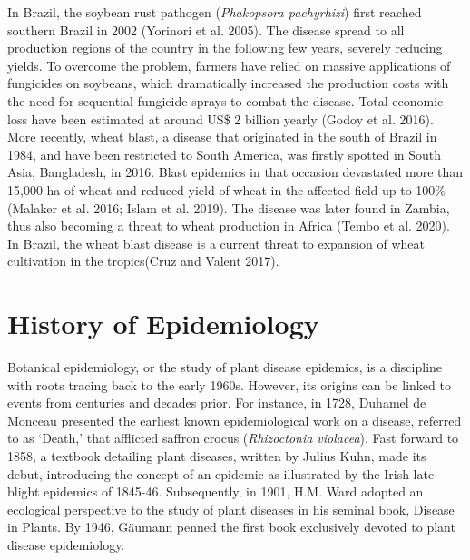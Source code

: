\documentclass[
  letterpaper,
  DIV=11,
  numbers=noendperiod]{scrreprt}
\begin{document}
\begin{tcolorbox}[enhanced jigsaw, bottomtitle=1mm, colbacktitle=quarto-callout-note-color!10!white, breakable, left=2mm, leftrule=.75mm, rightrule=.15mm, toprule=.15mm, colframe=quarto-callout-note-color-frame, arc=.35mm, toptitle=1mm, opacityback=0, coltitle=black, title=\textcolor{quarto-callout-note-color}{\faInfo}\hspace{0.5em}{Box 1: Diseases on the move}, colback=white, titlerule=0mm, bottomrule=.15mm, opacitybacktitle=0.6]

In Brazil, the soybean rust pathogen (\emph{Phakopsora pachyrhizi})
first reached southern Brazil in 2002 (Yorinori et al. 2005). The
disease spread to all production regions of the country in the following
few years, severely reducing yields. To overcome the problem, farmers
have relied on massive applications of fungicides on soybeans, which
dramatically increased the production costs with the need for sequential
fungicide sprays to combat the disease. Total economic loss have been
estimated at around US\$ 2 billion yearly (Godoy et al. 2016). More
recently, wheat blast, a disease that originated in the south of Brazil
in 1984, and have been restricted to South America, was firstly spotted
in South Asia, Bangladesh, in 2016. Blast epidemics in that occasion
devastated more than 15,000 ha of wheat and reduced yield of wheat in
the affected field up to 100\% (Malaker et al. 2016; Islam et al. 2019).
The disease was later found in Zambia, thus also becoming a threat to
wheat production in Africa (Tembo et al. 2020). In Brazil, the wheat
blast disease is a current threat to expansion of wheat cultivation in
the tropics(Cruz and Valent 2017).

\end{tcolorbox}

\hypertarget{history-of-epidemiology}{%
\section{History of Epidemiology}\label{history-of-epidemiology}}

Botanical epidemiology, or the study of plant disease epidemics, is a
discipline with roots tracing back to the early 1960s. However, its
origins can be linked to events from centuries and decades prior. For
instance, in 1728, Duhamel de Monceau presented the earliest known
epidemiological work on a disease, referred to as `Death,' that
afflicted saffron crocus (\emph{Rhizoctonia violacea}). Fast forward to
1858, a textbook detailing plant diseases, written by Julius Kuhn, made
its debut, introducing the concept of an epidemic as illustrated by the
Irish late blight epidemics of 1845-46. Subsequently, in 1901, H.M. Ward
adopted an ecological perspective to the study of plant diseases in his
seminal book, Disease in Plants. By 1946, Gäumann penned the first book
exclusively devoted to plant disease epidemiology.
\end{document}
